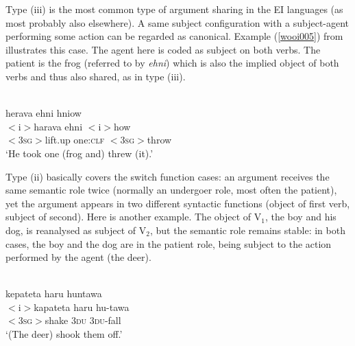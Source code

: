 Type (iii) is the most common type of argument sharing in the EI languages (as most probably also elsewhere). A same subject configuration with a subject-agent performing some action can be regarded as canonical. Example (\ref{wooi005}) from  illustrates this case. The agent here is coded as subject on both verbs. The patient is the frog (referred to by \textit{ehni}) which is also the implied object of both verbs and thus also shared, as in type (iii).

\ea \label{wooi005}
\\
\glll herava ehni hniow \\
$<$i$>$harava ehni $<$i$>$how \\
$<$3\textsc{sg}$>$lift.up one:\textsc{clf} $<$3\textsc{sg}$>$throw \\
\glft `He took one (frog and) threw (it).'\\ 
\z

Type (ii) basically covers the switch function cases: an argument receives the same semantic role twice (normally an undergoer role, most often the patient), yet the argument appears in two different syntactic functions (object of first verb, subject of second). Here is another  example. The object of V$_1$, the boy and his dog, is reanalysed as subject of V$_2$, but the semantic role remains stable: in both cases, the boy and the dog are in the patient role, being subject to the action performed by the agent (the deer).

\ea 
{}\\
\glll kepateta haru huntawa \\
$<$i$>$kapateta haru hu-tawa \\
$<$3\textsc{sg}$>$shake 3\textsc{du} 3\textsc{du}-fall \\
\glft `(The deer) shook them off.'\\ 
\z

